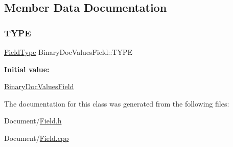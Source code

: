 \subsection{Member Data Documentation}
\mbox{\label{classlucene_1_1core_1_1document_1_1BinaryDocValuesField_a0602bedeb853cd58ec5185a239503d1a}} 
\subsubsection{\texorpdfstring{T\+Y\+PE}{TYPE}}
{\footnotesize\ttfamily \mbox{\hyperlink{classlucene_1_1core_1_1document_1_1FieldType}{Field\+Type}} Binary\+Doc\+Values\+Field\+::\+T\+Y\+PE\hspace{0.3cm}{\ttfamily [static]}}

{\bfseries Initial value\+:}
\begin{DoxyCode}
\DoxyCodeLine{= []() \{}
\DoxyCodeLine{\}()}
\end{DoxyCode}
\mbox{\hyperlink{classlucene_1_1core_1_1document_1_1BinaryDocValuesField}{Binary\+Doc\+Values\+Field}} 

The documentation for this class was generated from the following files\+:\begin{DoxyCompactItemize}
\item 
Document/\mbox{\hyperlink{Document_2Field_8h}{Field.\+h}}\item 
Document/\mbox{\hyperlink{Field_8cpp}{Field.\+cpp}}\end{DoxyCompactItemize}
